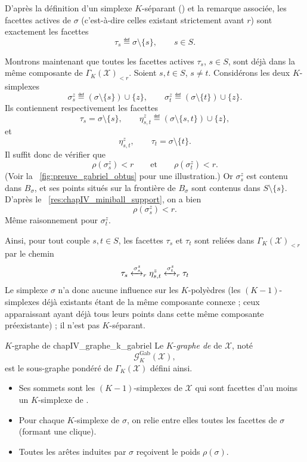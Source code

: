 \begin{Preuve}
D'après la définition d'un simplexe $K$-séparant () et la remarque associée, les facettes actives de $\sigma$ (c'est-à-dire celles existant strictement avant $r$) sont exactement les facettes
\[
    \tau_s\eqdef\sigma\setminus\{s\},
    \qquad s\in S.
\]

Montrons maintenant que toutes les facettes actives $\tau_s$, $s\in S$, sont déjà dans la même composante de $\Gamma_K(\mathcal X)_{<r}$.
Soient $s,t\in S$, $s\neq t$. Considérons les deux $K$-simplexes
\[
    \sigma_s^z\eqdef(\sigma\setminus\{s\})\cup\{z\},
    \qquad
    \sigma_t^z\eqdef(\sigma\setminus\{t\})\cup\{z\}.
\]
Ils contiennent respectivement les facettes
\[
    \tau_s=\sigma\setminus\{s\},
    \qquad
    \eta_{s,t}^z\eqdef(\sigma\setminus\{s,t\})\cup\{z\},
\]
et
\[
    \eta_{s,t}^z,
    \qquad
    \tau_t=\sigma\setminus\{t\}.
\]
Il suffit donc de vérifier que
\[
    \rho(\sigma_s^z)<r
    \qquad\text{et}\qquad
    \rho(\sigma_t^z)<r.
\]
(Voir la \Fig~\ref{fig:preuve_gabriel_obtus} pour une illustration.)
Or $\sigma_s^z$ est contenu dans $B_\sigma$, et ses points situés sur la frontière de $B_\sigma$ sont contenus dans $S\setminus\{s\}$. D'après le \Res~\ref{res:chapIV_miniball_support}, on a bien
\[
\rho(\sigma_s^z)<r.
\]
Même raisonnement pour $\sigma_t^z$.

Ainsi, pour tout couple $s,t\in S$, les facettes $\tau_s$ et $\tau_t$ sont reliées dans $ \Gamma_K(\mathcal X)_{<r}$ par le chemin
\[
    \tau_s \xleftrightarrow{\sigma_s^z}_r \eta_{s,t}^z \xleftrightarrow{\sigma_t^z}_r \tau_t
\]
Le simplexe $\sigma$ n'a donc aucune influence sur les $K$-polyèdres (les $(K-1)$-simplexes déjà existants étant de la même composante connexe ; ceux apparaissant ayant déjà tous leurs points dans cette même composante préexistante) ; il n'est pas $K$-séparant.
\end{Preuve}

\begin{Definition}{$K$-graphe de }{chapIV_graphe_k_gabriel}
Le $K$-\emph{graphe de } de $\mathcal X$, noté
\[
\boxed{
    \mathcal G_K^{\mathrm{Gab}}(\mathcal X),
    }
\]
est le sous-graphe pondéré de $\Gamma_K(\mathcal X)$ défini ainsi.
\begin{itemize}
    \item Ses sommets sont les $(K-1)$-simplexes de $\mathcal X$ qui sont facettes d'au moins un $K$-simplexe de .
    \item Pour chaque $K$-simplexe de  $\sigma$, on relie entre elles toutes les facettes de $\sigma$ (formant une clique).
    \item Toutes les arêtes induites par $\sigma$ reçoivent le poids $\rho(\sigma)$.
\end{itemize}
\end{Definition}

